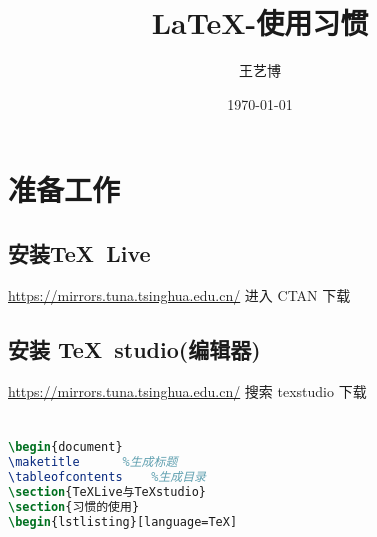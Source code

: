 \documentclass[hyperref,a4paper,UTF8]{ctexart}%
\title{\LaTeX-使用习惯}
\author{\kaishu 王艺博}
\date{\today}
\begin{document}
	\maketitle		%
	\tableofcontents	%
\section{准备工作}
	\subsection{安装\TeX \ Live}
	\url{https://mirrors.tuna.tsinghua.edu.cn/}	进入 CTAN 下载
	\subsection{安装 \TeX \ studio(编辑器)}
	\url{https://mirrors.tuna.tsinghua.edu.cn/}	搜索 texstudio 下载
	\section{}
	\begin{lstlisting}[language=TeX]
\begin{document}
\maketitle		%生成标题
\tableofcontents	%生成目录
\section{TeXLive与TeXstudio}
\section{习惯的使用}
\begin{lstlisting}[language=TeX]

			
	\end{lstlisting}
	
	\section{}

	
\end{document}
